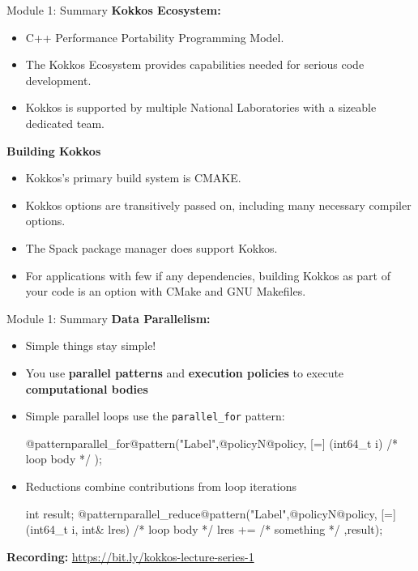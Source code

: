 \begin{frame}{Module 1: Summary}
	\textbf{Kokkos Ecosystem:}
	\begin{itemize}
		\item C++ Performance Portability Programming Model.
		\item The Kokkos Ecosystem provides capabilities needed for serious code development.
		\item Kokkos is supported by multiple National Laboratories with a sizeable dedicated team.
	\end{itemize}

	\textbf{Building Kokkos}
	\begin{itemize}
    \item{Kokkos's primary build system is CMAKE.}
    \item{Kokkos options are transitively passed on, including many necessary compiler options.}
    \item{The Spack package manager does support Kokkos.}
    \item{For applications with few if any dependencies, building Kokkos as part of your code is an option with CMake and GNU Makefiles.}
	\end{itemize}
\end{frame}

\begin{frame}[fragile]{Module 1: Summary}
	\textbf{Data Parallelism:}
	\begin{itemize}
		\item Simple things stay simple!
		\item You use \textbf{parallel patterns} and \textbf{execution policies} to execute \textbf{computational bodies}
		\item Simple parallel loops use the \texttt{parallel\_for} pattern:
\begin{code}[linebackgroundcolor={\btLstHL<1->{3}{bodyColor}},frame=single]
  @patternparallel_for@pattern("Label",@policyN@policy, [=] (int64_t i) {
   /* loop body */
  });
\end{code}
\item Reductions combine contributions from loop iterations
\begin{code}[linebackgroundcolor={\btLstHL<1->{3}{bodyColor}},frame=single]
int result;
@patternparallel_reduce@pattern("Label",@policyN@policy, [=] (int64_t i, int& lres) {
   /* loop body */
    lres += /* something */
  },result);
\end{code}

\end{itemize}

	\textbf{Recording:} \url{https://bit.ly/kokkos-lecture-series-1}

\end{frame}

